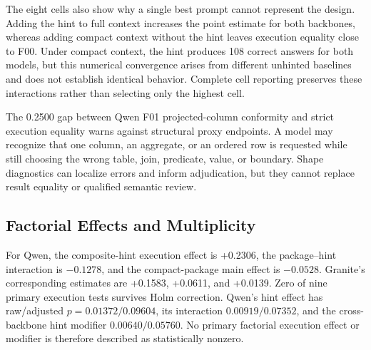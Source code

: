\documentclass[applsci,article,submit,moreauthors]{Definitions/mdpi}
\begin{document}
The eight cells also show why a single best prompt cannot represent the design. Adding the hint to full context increases the point estimate for both backbones, whereas adding compact context without the hint leaves execution equality close to F00. Under compact context, the hint produces 108 correct answers for both models, but this numerical convergence arises from different unhinted baselines and does not establish identical behavior. Complete cell reporting preserves these interactions rather than selecting only the highest cell.

The 0.2500 gap between Qwen F01 projected-column conformity and strict execution equality warns against structural proxy endpoints. A model may recognize that one column, an aggregate, or an ordered row is requested while still choosing the wrong table, join, predicate, value, or boundary. Shape diagnostics can localize errors and inform adjudication, but they cannot replace result equality or qualified semantic review.

\subsection{Factorial Effects and Multiplicity}

For Qwen, the composite-hint execution effect is +0.2306, the package--hint interaction is $-0.1278$, and the compact-package main effect is $-0.0528$. Granite's corresponding estimates are +0.1583, +0.0611, and +0.0139. Zero of nine primary execution tests survives Holm correction. Qwen's hint effect has raw/adjusted $p=0.01372/0.09604$, its interaction $0.00919/0.07352$, and the cross-backbone hint modifier $0.00640/0.05760$. No primary factorial execution effect or modifier is therefore described as statistically nonzero.
\end{document}
